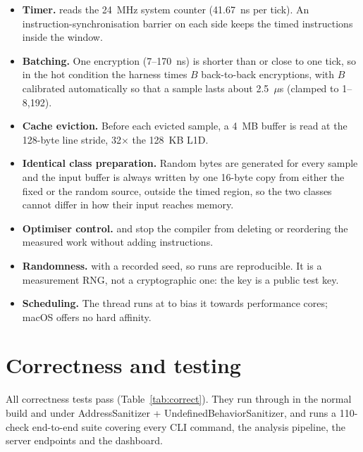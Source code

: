 \begin{itemize}
  \item \textbf{Timer.}  reads the 24~MHz system counter (41.67~ns per tick). An  instruction-synchronisation barrier on each side keeps the timed instructions inside the window.
  \item \textbf{Batching.} One encryption (7--170~ns) is shorter than or close to one tick, so in the hot condition the harness times $B$ back-to-back encryptions, with $B$ calibrated automatically so that a sample lasts about 2.5~$\mu$s (clamped to 1--8,192).
  \item \textbf{Cache eviction.} Before each evicted sample, a 4~MB buffer is read at the 128-byte line stride, 32$\times$ the 128~KB L1D.
  \item \textbf{Identical class preparation.} Random bytes are generated for every sample and the input buffer is always written by one 16-byte copy from either the fixed or the random source, outside the timed region, so the two classes cannot differ in how their input reaches memory.
  \item \textbf{Optimiser control.}  and  stop the compiler from deleting or reordering the measured work without adding instructions.
  \item \textbf{Randomness.}  with a recorded seed, so runs are reproducible. It is a measurement RNG, not a cryptographic one: the key is a public test key.
  \item \textbf{Scheduling.} The thread runs at  to bias it towards performance cores; macOS offers no hard affinity.
\end{itemize}

\section{Correctness and testing}
\label{sec:correct}

All correctness tests pass (Table~\ref{tab:correct}). They run through  in the normal build and under AddressSanitizer + UndefinedBehaviorSanitizer, and  runs a 110-check end-to-end suite covering every CLI command, the analysis pipeline, the server endpoints and the dashboard.

